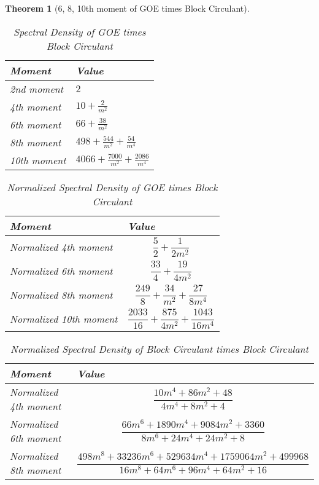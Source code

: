 \documentclass{article}
\newtheorem{theorem}{Theorem}
\begin{document}
\begin{theorem}[6, 8, 10th moment of GOE times Block Circulant]
    
\begin{table}[h!]
\centering
\caption{Spectral Density of GOE times Block Circulant}
\renewcommand{\arraystretch}{1.5} %
\begin{tabular}{|>{\centering\arraybackslash}m{3cm}|>{\centering\arraybackslash}m{7cm}|}
\hline
\textbf{Moment} & \textbf{Value} \\
\hline
2nd moment & $2$ \\
\hline
4th moment & $10 + \frac{2}{m^2}$ \\
\hline
6th moment & $66 + \frac{38}{m^2}$ \\
\hline
8th moment & $498 + \frac{544}{m^2} + \frac{54}{m^4}$ \\
\hline
10th moment & $4066 + \frac{7000}{m^2} + \frac{2086}{m^4}$ \\
\hline
\end{tabular}
\end{table}


\begin{table}[h!]
\centering
\caption{Normalized Spectral Density of GOE times Block Circulant}
\renewcommand{\arraystretch}{1.5} %
\begin{tabular}{|>{\centering\arraybackslash}m{3cm}|>{\centering\arraybackslash}m{10cm}|}
\hline
\textbf{Moment} & \textbf{Value} \\
\hline
Normalized 4th moment & $$\frac{5}{2} + \frac{1}{2m^2}$$ \\
\hline
Normalized 6th moment & $$\frac{33}{4} + \frac{19}{4m^2}$$ \\
\hline
Normalized 8th moment & $$\frac{249}{8} + \frac{34}{m^2} + \frac{27}{8m^4}$$ \\
\hline
Normalized 10th moment & $$\frac{2033}{16} + \frac{875}{4m^2} + \frac{1043}{16m^4}$$ \\
\hline
\end{tabular}
\end{table}

\begin{table}[h!]
\centering
\caption{Normalized Spectral Density of Block Circulant times Block Circulant}
\renewcommand{\arraystretch}{1.5} %
\begin{tabular}{|>{\centering\arraybackslash}m{3cm}|>{\centering\arraybackslash}m{10cm}|}
\hline
\textbf{Moment} & \textbf{Value} \\
\hline
Normalized 4th moment & $$ \frac{10m^4 + 86m^2 + 48}{4m^4 + 8m^2 + 4}$$ \\
\hline
Normalized 6th moment & $$\frac{66m^6 + 1890m^4 + 9084m^2 + 3360}{8m^6 + 24m^4 + 24m^2 + 8}$$ \\
\hline
Normalized 8th moment & $$ \frac{498m^8 + 33236m^6 + 529634m^4 + 1759064m^2 + 499968}{16m^8 + 64m^6 + 96m^4 + 64m^2 + 16}$$ \\
\hline
\end{tabular}
\end{table}


\end{theorem}
\end{document}
